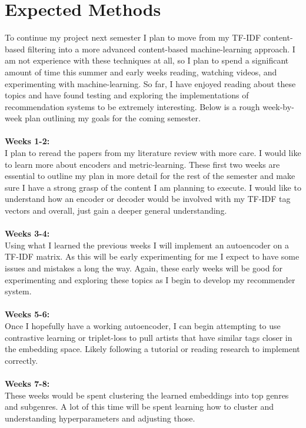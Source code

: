 \documentclass[10pt,twocolumn]{article}
\begin{document}
\section{Expected Methods}
To continue my project next semester I plan to move from my TF-IDF content-based filtering into a more advanced content-based machine-learning approach. I am not experience with these techniques at all, so I plan to spend a significant amount of time this summer and early weeks reading, watching videos, and experimenting with machine-learning. So far, I have enjoyed reading about these topics and have found testing and exploring the implementations of recommendation systems to be extremely interesting. Below is a rough week-by-week plan outlining my goals for the coming semester.\\\\
\noindent
\textbf{Weeks 1-2:}\\
I plan to reread the papers from my literature review with more care. I would like to learn more about encoders and metric-learning. These first two weeks are essential to outline my plan in more detail for the rest of the semester and make sure I have a strong grasp of the content I am planning to execute. I would like to understand how an encoder or decoder would be involved with my TF-IDF tag vectors and overall, just gain a deeper general understanding.\\\\
\textbf{Weeks 3-4:}\\
Using what I learned the previous weeks I will implement an autoencoder on a TF-IDF matrix. As this will be early experimenting for me I expect to have some issues and mistakes a long the way. Again, these early weeks will be good for experimenting and exploring these topics as I begin to develop my recommender system.\\\\
\textbf{Weeks 5-6:}\\
Once I hopefully have a working autoencoder, I can begin attempting to use contrastive learning or triplet-loss to pull artists that have similar tags closer in the embedding space. Likely following a tutorial or reading research to implement correctly.\\\\
\textbf{Weeks 7-8:}\\
These weeks would be spent clustering the learned embeddings into top genres and subgenres. A lot of this time will be spent learning how to cluster and understanding hyperparameters and adjusting those.\\\\
\end{document}
